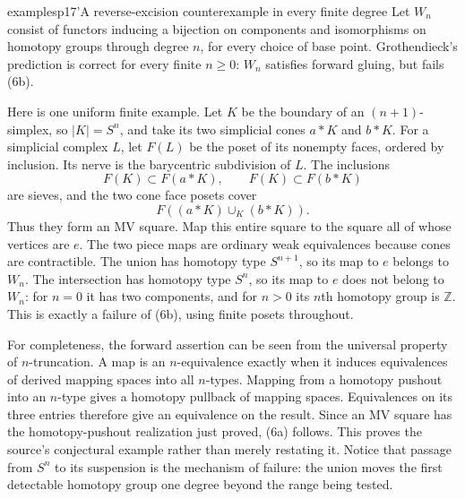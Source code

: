 \begin{dcomment}{examples}{p17'}{A reverse-excision counterexample in every finite degree}
Let $W_n$ consist of functors inducing a bijection on components and isomorphisms on homotopy groups through degree $n$, for every choice of base point. Grothendieck's prediction is correct for every finite $n\geq0$: $W_n$ satisfies forward gluing, but fails (6b).

Here is one uniform finite example. Let $K$ be the boundary of an $(n+1)$-simplex, so $|K|=S^n$, and take its two simplicial cones $a*K$ and $b*K$. For a simplicial complex $L$, let $F(L)$ be the poset of its nonempty faces, ordered by inclusion. Its nerve is the barycentric subdivision of $L$. The inclusions
\[
F(K)\subset F(a*K),\qquad F(K)\subset F(b*K)
\]
are sieves, and the two cone face posets cover
\[
F((a*K)\cup_K(b*K)).
\]
Thus they form an MV square. Map this entire square to the square all of whose vertices are $e$. The two piece maps are ordinary weak equivalences because cones are contractible. The union has homotopy type $S^{n+1}$, so its map to $e$ belongs to $W_n$. The intersection has homotopy type $S^n$, so its map to $e$ does not belong to $W_n$: for $n=0$ it has two components, and for $n>0$ its $n$th homotopy group is $\mathbb Z$. This is exactly a failure of (6b), using finite posets throughout.

For completeness, the forward assertion can be seen from the universal property of $n$-truncation. A map is an $n$-equivalence exactly when it induces equivalences of derived mapping spaces into all $n$-types. Mapping from a homotopy pushout into an $n$-type gives a homotopy pullback of mapping spaces. Equivalences on its three entries therefore give an equivalence on the result. Since an MV square has the homotopy-pushout realization just proved, (6a) follows. This proves the source's conjectural example rather than merely restating it. Notice that passage from $S^n$ to its suspension is the mechanism of failure: the union moves the first detectable homotopy group one degree beyond the range being tested.
\end{dcomment}

